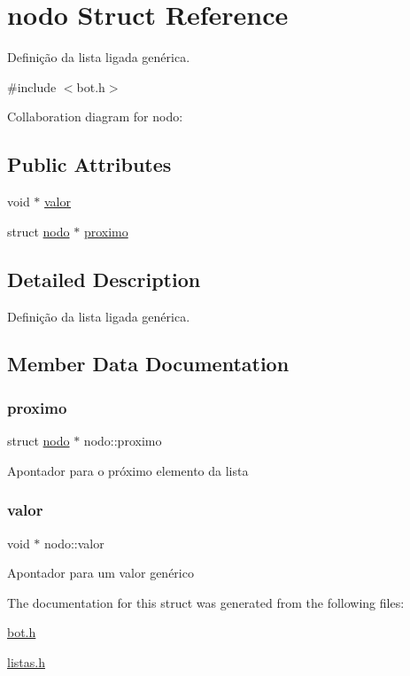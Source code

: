 \hypertarget{structnodo}{}\section{nodo Struct Reference}
\label{structnodo}


Definição da lista ligada genérica.  




{\ttfamily \#include $<$bot.\+h$>$}



Collaboration diagram for nodo\+:
\subsection*{Public Attributes}
\begin{DoxyCompactItemize}
\item 
void $\ast$ \hyperlink{structnodo_a344b5b1cb9597ce38786e9d21bb6f42d}{valor}
\item 
struct \hyperlink{structnodo}{nodo} $\ast$ \hyperlink{structnodo_a89841e92650be541e8bc568a20765e82}{proximo}
\end{DoxyCompactItemize}


\subsection{Detailed Description}
Definição da lista ligada genérica. 

\subsection{Member Data Documentation}
\mbox{\label{structnodo_a89841e92650be541e8bc568a20765e82}} 
\subsubsection{\texorpdfstring{proximo}{proximo}}
{\footnotesize\ttfamily struct \hyperlink{structnodo}{nodo} $\ast$ nodo\+::proximo}

Apontador para o próximo elemento da lista \mbox{\label{structnodo_a344b5b1cb9597ce38786e9d21bb6f42d}} 
\subsubsection{\texorpdfstring{valor}{valor}}
{\footnotesize\ttfamily void $\ast$ nodo\+::valor}

Apontador para um valor genérico 

The documentation for this struct was generated from the following files\+:\begin{DoxyCompactItemize}
\item 
\hyperlink{bot_8h}{bot.\+h}\item 
\hyperlink{listas_8h}{listas.\+h}\end{DoxyCompactItemize}
